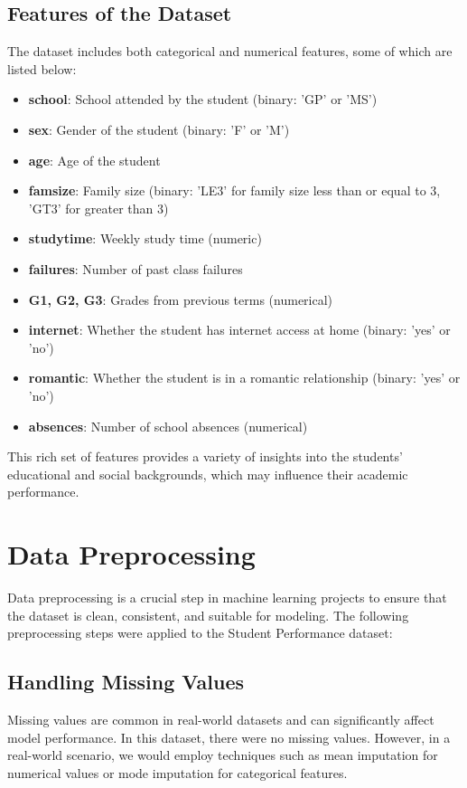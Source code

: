\documentclass[a4paper,12pt]{article}
\begin{document}
\subsection{Features of the Dataset}
The dataset includes both categorical and numerical features, some of which are listed below:
\begin{itemize}
    \item \textbf{school}: School attended by the student (binary: 'GP' or 'MS')
    \item \textbf{sex}: Gender of the student (binary: 'F' or 'M')
    \item \textbf{age}: Age of the student
    \item \textbf{famsize}: Family size (binary: 'LE3' for family size less than or equal to 3, 'GT3' for greater than 3)
    \item \textbf{studytime}: Weekly study time (numeric)
    \item \textbf{failures}: Number of past class failures
    \item \textbf{G1, G2, G3}: Grades from previous terms (numerical)
    \item \textbf{internet}: Whether the student has internet access at home (binary: 'yes' or 'no')
    \item \textbf{romantic}: Whether the student is in a romantic relationship (binary: 'yes' or 'no')
    \item \textbf{absences}: Number of school absences (numerical)
\end{itemize}

This rich set of features provides a variety of insights into the students' educational and social backgrounds, which may influence their academic performance.

\section{Data Preprocessing}
Data preprocessing is a crucial step in machine learning projects to ensure that the dataset is clean, consistent, and suitable for modeling. The following preprocessing steps were applied to the Student Performance dataset:

\subsection{Handling Missing Values}
Missing values are common in real-world datasets and can significantly affect model performance. In this dataset, there were no missing values. However, in a real-world scenario, we would employ techniques such as mean imputation for numerical values or mode imputation for categorical features.
\end{document}
